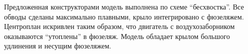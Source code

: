 Предложенная конструкторами модель выполнена по схеме ``бесхвостка''. Все обводы сделаны максимально плавными, крыло интегрировано с фюзеляжем. Центроплан искривлен таким образом, что двигатель с воздухозаборником оказываются ``утоплены'' в фюзеляж. Модель обладает крылом большого удлинения и несущим фюзеляжем. 

